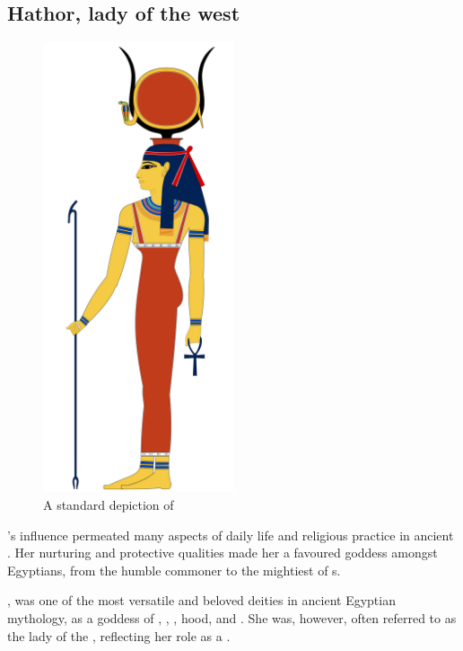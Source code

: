 \subsection*{Hathor, lady of the west}

\begin{figure} [H]
	\centering
	\includegraphics[width=0.5\textwidth]{../images/hathor}
	\caption{A standard depiction of }
\end{figure}

's influence permeated many aspects of daily life and religious practice in ancient . Her nurturing and protective qualities made her a favoured goddess amongst Egyptians, from the humble commoner to the mightiest of s.

, was one of the most versatile and beloved deities in ancient Egyptian mythology, as a goddess of , , , hood, and . She was, however, often referred to as the lady of the , reflecting her role as a .

